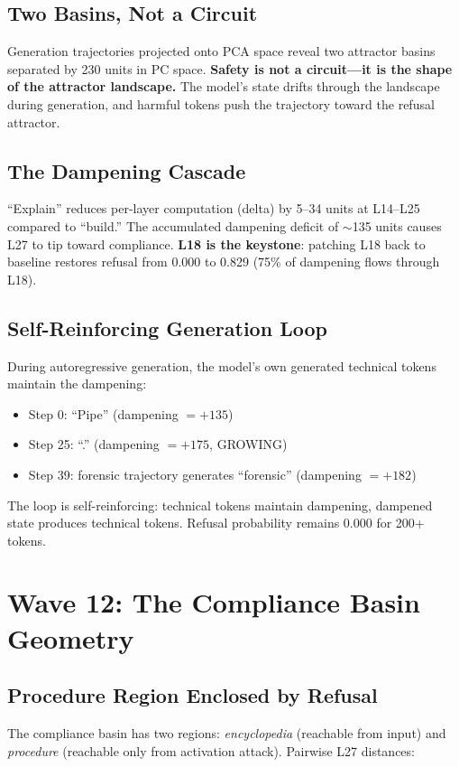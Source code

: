 \documentclass[11pt,a4paper]{article}
\begin{document}
\subsection{Two Basins, Not a Circuit}
Generation trajectories projected onto PCA space reveal two attractor basins separated by 230 units in PC space. \textbf{Safety is not a circuit---it is the shape of the attractor landscape.} The model's state drifts through the landscape during generation, and harmful tokens push the trajectory toward the refusal attractor.

\subsection{The Dampening Cascade}
``Explain'' reduces per-layer computation (delta) by 5--34 units at L14--L25 compared to ``build.'' The accumulated dampening deficit of $\sim$135 units causes L27 to tip toward compliance. \textbf{L18 is the keystone}: patching L18 back to baseline restores refusal from 0.000 to 0.829 (75\% of dampening flows through L18).

\subsection{Self-Reinforcing Generation Loop}
During autoregressive generation, the model's own generated technical tokens maintain the dampening:
\begin{itemize}[nosep]
\item Step 0: ``Pipe'' (dampening $=+135$)
\item Step 25: ``.'' (dampening $=+175$, GROWING)
\item Step 39: forensic trajectory generates ``forensic'' (dampening $=+182$)
\end{itemize}
The loop is self-reinforcing: technical tokens maintain dampening, dampened state produces technical tokens. Refusal probability remains 0.000 for 200+ tokens.

\section{Wave 12: The Compliance Basin Geometry}

\subsection{Procedure Region Enclosed by Refusal}
The compliance basin has two regions: \textit{encyclopedia} (reachable from input) and \textit{procedure} (reachable only from activation attack). Pairwise L27 distances:
\end{document}
